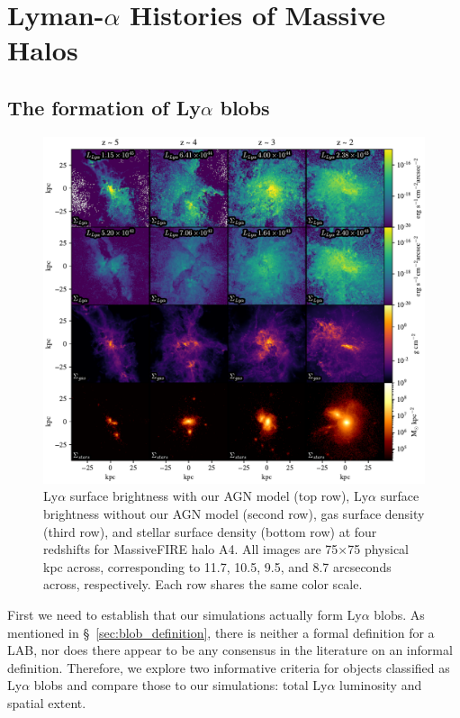 \chapter{Lyman-\texorpdfstring{$\alpha$}{a} Histories of Massive Halos}

\section{The formation of Ly\texorpdfstring{$\alpha$}{a} blobs}
\label{sec:formation_of_labs}

\begin{figure}
    \centering
    \includegraphics[width=\textwidth,height=\textheight,keepaspectratio]{figures/grid_plot.pdf}
    \caption{
        Ly$\alpha$ surface brightness with our AGN model (top row), Ly$\alpha$ surface brightness without our AGN model (second row), gas surface density (third row), and stellar surface density (bottom row) at four redshifts for MassiveFIRE halo A4.
        All images are 75$\times$75 physical kpc across, corresponding to 11.7, 10.5, 9.5, and 8.7 arcseconds across, respectively.
        Each row shares the same color scale.}
  \label{fig:grid_plot}
\end{figure}

First we need to establish that our simulations actually form Ly$\alpha$ blobs.
As mentioned in \S~\ref{sec:blob_definition}, there is neither a formal definition for a LAB, nor does there appear to be any consensus in the literature on an informal definition.
Therefore, we explore two informative criteria for objects classified as Ly$\alpha$ blobs and compare those to our simulations: total Ly$\alpha$ luminosity and spatial extent.

